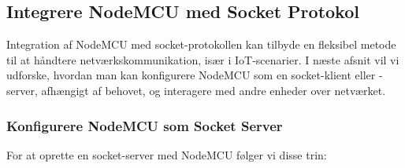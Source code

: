 \documentclass[12pt,a4paper]{book}
\begin{document}
	\subsection*{Integrere NodeMCU med Socket Protokol}
	Integration af NodeMCU med socket-protokollen kan tilbyde en fleksibel metode til at håndtere netværkskommunikation, især i IoT-scenarier. I næste afsnit vil vi udforske, hvordan man kan konfigurere NodeMCU som en socket-klient eller -server, afhængigt af behovet, og interagere med andre enheder over netværket.
	
	\subsubsection*{Konfigurere NodeMCU som Socket Server}
	For at oprette en socket-server med NodeMCU følger vi disse trin:
	
\end{document}
